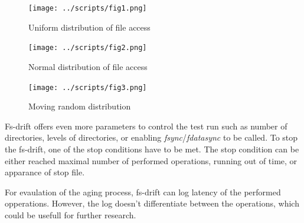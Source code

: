 \documentclass[
  color, %
  table, %
  lof,   %
  lot,   %
]{fithesis3}
\begin{document}
\begin{figure}[!htb]
    \centering
    \begin{minipage}{\textwidth}
        \centering
        \texttt{[image: ../scripts/fig1.png]}
        \caption{Uniform distribution of file access}
\label{fig:rand1}
    \end{minipage}\hfill
    \begin{minipage}{\textwidth}
        \centering
        \texttt{[image: ../scripts/fig2.png]}
        \caption{Normal distribution of file access}

\label{fig:rand2}
    \end{minipage}

\end{figure}
\begin{figure}
    \begin{minipage}{\textwidth}
        \centering
        \texttt{[image: ../scripts/fig3.png]}
        \caption{Moving random distribution}
\label{fig:rand3}
    \end{minipage}
\end{figure}



Fs-drift offers even more parameters to control the test run such as number of directories, levels of directories, or enabling \textit{fsync}/\textit{fdatasync} to be called. To stop the fs-drift, one of the stop conditions have to be met. The stop condition can be either reached maximal number of performed operations, running out of time, or apparance of stop file.

For evaulation of the aging process, fs-drift can log latency of the performed opperations. However, the log doesn't differentiate between the operations, which could be usefull for further research.
\end{document}
